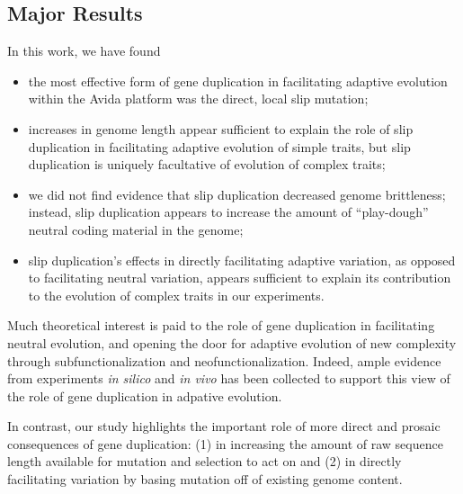 \subsection{Major Results}

In this work, we have found
\begin{itemize}
\item the most effective form of gene duplication in facilitating adaptive evolution within the Avida platform was the direct, local slip mutation;
\item increases in genome length appear sufficient to explain the role of slip duplication in facilitating adaptive evolution of simple traits, but slip duplication is uniquely facultative of evolution of complex traits;
\item we did not find evidence that slip duplication decreased genome brittleness; instead, slip duplication appears to increase the amount of ``play-dough'' neutral coding material in the genome;
\item slip duplication's effects in directly facilitating adaptive variation, as opposed to facilitating neutral variation, appears sufficient to explain its contribution to the evolution of complex traits in our experiments.
\end{itemize}

Much theoretical interest is paid to the role of gene duplication in facilitating neutral evolution, and opening the door for adaptive evolution of new complexity through subfunctionalization and neofunctionalization.
Indeed, ample evidence from experiments \textit{in silico} and \textit{in vivo} has been collected to support this view of the role of gene duplication in adpative evolution.

In contrast, our study highlights the important role of more direct and prosaic consequences of gene duplication: (1) in increasing the amount of raw sequence length available for mutation and selection to act on and (2) in directly facilitating variation by basing mutation off of existing genome content.


